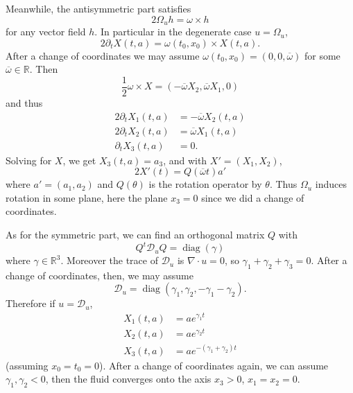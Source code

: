 \documentclass[12pt]{book}
\newcommand{\RR}{\mathbb{R}}
\DeclareMathOperator{\diag}{diag}
\theoremstyle{definition}
\begin{document}
Meanwhile, the antisymmetric part satisfies
$$2\Omega_u h = \omega \times h$$
for any vector field $h$. In particular in the degenerate case $u = \Omega_u$,
$$2\partial_t X(t, a) = \omega(t_0, x_0) \times X(t, a).$$
After a change of coordinates we may assume $\omega(t_0, x_0) = (0, 0, \overline \omega)$ for some $\overline \omega \in \RR$.
Then
$$\frac{1}{2}\omega \times X = (-\overline \omega X_2, \overline \omega X_1, 0)$$
and thus
\begin{align*}
2\partial_t X_1(t, a) &= -\overline \omega X_2(t, a)\\
2\partial_t X_2(t, a) &= \overline \omega X_1(t, a)\\
\partial_t X_3(t, a) &= 0.
\end{align*}
Solving for $X$, we get $X_3(t, a) = a_3$, and with $X' = (X_1, X_2)$,
$$2X'(t) = Q(\overline \omega t)a'$$
where $a' = (a_1, a_2)$ and $Q(\theta)$ is the rotation operator by $\theta$.
Thus $\Omega_u$ induces rotation in some plane, here the plane $x_3 = 0$ since we did a change of coordinates.

As for the symmetric part, we can find an orthogonal matrix $Q$ with
$$Q^t \mathscr D_u Q = \diag(\gamma)$$
where $\gamma \in \RR^3$. Moreover the trace of $\mathscr D_u$ is $\nabla \cdot u = 0$, so $\gamma_1 + \gamma_2 + \gamma_3 = 0$.
After a change of coordinates, then, we may assume
$$\mathscr D_u = \diag(\gamma_1, \gamma_2, -\gamma_1 - \gamma_2).$$
Therefore if $u = \mathscr D_u$,
\begin{align*}
X_1(t, a) &= ae^{\gamma_1t}\\
X_2(t, a) &= ae^{\gamma_2t}\\
X_3(t, a) &= ae^{-(\gamma_1 + \gamma_2)t}
\end{align*}
(assuming $x_0 = t_0 = 0$).
After a change of coordinates again, we can assume $\gamma_1, \gamma_2 < 0$, then the fluid converges onto the axis $x_3 > 0$, $x_1 = x_2 = 0$.
\end{document}
